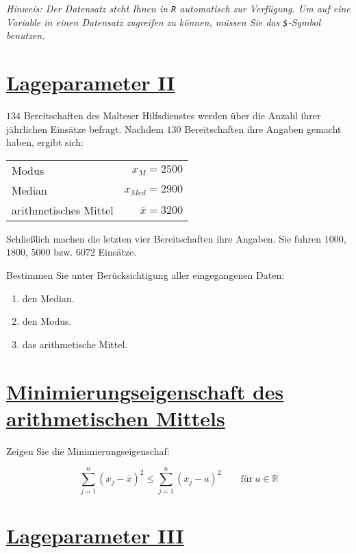 \documentclass[12pt,a4paper]{article}
\newcommand{\tmpsection}[1]{}
\let\tmpsection=\section
\renewcommand{\section}[1]{\tmpsection{\underline{#1}} }
\begin{document}
\emph{Hinweis: Der Datensatz steht Ihnen in \texttt{R} automatisch zur
Verfügung. Um auf eine Variable in einen Datensatz zugreifen zu können,
müssen Sie das \texttt{\$}-Symbol benutzen.}

\hypertarget{lageparameter-ii}{%
\section{Lageparameter II}\label{lageparameter-ii}}

\(134\) Bereitschaften des Malteser Hilfsdienstes werden über die Anzahl
ihrer jährlichen Einsätze befragt. Nachdem \(130\) Bereitschaften ihre
Angaben gemacht haben, ergibt sich:

\FloatBarrier
\begin{table}[htp]
  \begin{tabular}{lr}
    Modus                 & $x_M = 2500$ \\
    Median                & $x_{Med} = 2900$ \\
    arithmetisches Mittel & $\bar{x} = 3200$
  \end{tabular}
\end{table}
\FloatBarrier

Schließlich machen die letzten vier Bereitschaften ihre Angaben. Sie
fuhren \(1000\), \(1800\), \(5000\) bzw. \(6072\) Einsätze.

Bestimmen Sie unter Berücksichtigung aller eingegangenen Daten:

\begin{enumerate}[label=(\alph*)]
  \item den Median. 
  \item den Modus. 
  \item das arithmetische Mittel. 
\end{enumerate}

\hypertarget{minimierungseigenschaft-des-arithmetischen-mittels}{%
\section{Minimierungseigenschaft des arithmetischen
Mittels}\label{minimierungseigenschaft-des-arithmetischen-mittels}}

Zeigen Sie die Minimierungseigenschaf:

\[\sum_{j = 1}^{n} (x_j - \bar{x})^{2} \leq \sum_{j = 1}^{n} (x_j - a)^{2} \qquad \text{für}\; a \in \mathbb{R}\]

\hypertarget{lageparameter-iii}{%
\section{Lageparameter III}\label{lageparameter-iii}}
\end{document}
